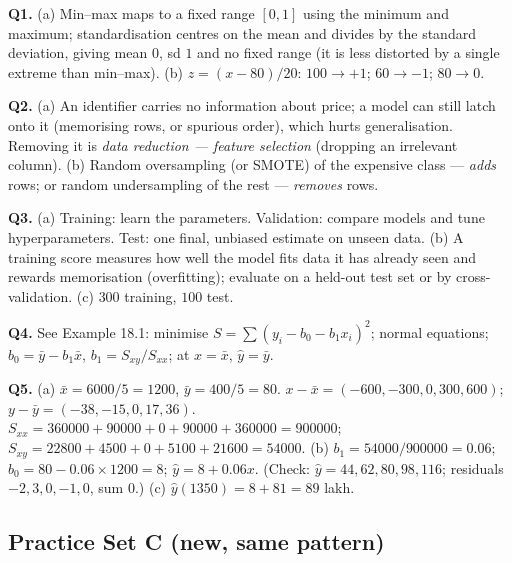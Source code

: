 \documentclass[11pt]{article}
\begin{document}
\begin{worked}
\textbf{Q1.} (a) Min--max maps to a fixed range $[0,1]$ using the minimum and
maximum; standardisation centres on the mean and divides by the standard
deviation, giving mean $0$, sd $1$ and no fixed range (it is less distorted by
a single extreme than min--max). (b) $z = (x - 80)/20$: $100 \to +1$;
$60 \to -1$; $80 \to 0$.

\textbf{Q2.} (a) An identifier carries no information about price; a model can
still latch onto it (memorising rows, or spurious order), which hurts
generalisation. Removing it is \emph{data reduction --- feature selection}
(dropping an irrelevant column). (b) Random oversampling (or SMOTE) of the
expensive class --- \emph{adds} rows; or random undersampling of the rest ---
\emph{removes} rows.

\textbf{Q3.} (a) Training: learn the parameters. Validation: compare models
and tune hyperparameters. Test: one final, unbiased estimate on unseen data.
(b) A training score measures how well the model fits data it has already
seen and rewards memorisation (overfitting); evaluate on a held-out test set
or by cross-validation. (c) $300$ training, $100$ test.

\textbf{Q4.} See Example 18.1: minimise $S = \sum(y_i - b_0 - b_1x_i)^2$;
normal equations; $b_0 = \bar y - b_1\bar x$, $b_1 = S_{xy}/S_{xx}$; at
$x = \bar x$, $\hat y = \bar y$.

\textbf{Q5.} (a) $\bar x = 6000/5 = 1200$, $\bar y = 400/5 = 80$.
$x - \bar x = (-600, -300, 0, 300, 600)$; $y - \bar y = (-38, -15, 0, 17,
36)$. $S_{xx} = 360000 + 90000 + 0 + 90000 + 360000 = 900000$;
$S_{xy} = 22800 + 4500 + 0 + 5100 + 21600 = 54000$.
(b) $b_1 = 54000/900000 = 0.06$; $b_0 = 80 - 0.06 \times 1200 = 8$;
$\hat y = 8 + 0.06x$. (Check: $\hat y = 44, 62, 80, 98, 116$; residuals
$-2, 3, 0, -1, 0$, sum $0$.) (c) $\hat y(1350) = 8 + 81 = 89$ lakh.
\end{worked}

\subsection*{Practice Set C \quad (new, same pattern)}
\end{document}
